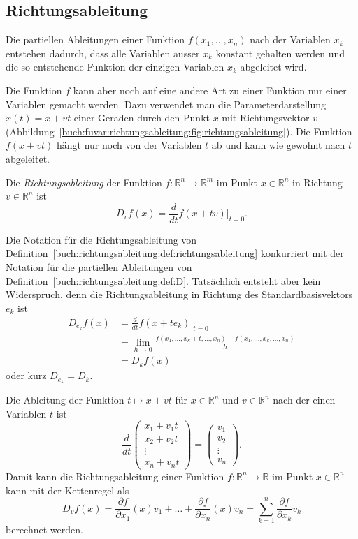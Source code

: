 %
%
\subsection{Richtungsableitung}
Die partiellen Ableitungen einer Funktion $f(x_1,\dots,x_n)$
nach der Variablen $x_k$ entstehen dadurch, dass alle Variablen
ausser $x_k$ konstant gehalten werden und die so entstehende
Funktion der einzigen Variablen $x_k$ abgeleitet wird.

Die Funktion $f$ kann aber noch auf eine andere Art zu einer
Funktion nur einer Variablen gemacht werden.
Dazu verwendet man die Parameterdarstellung $x(t) = x + vt$ einer
Geraden durch den Punkt $x$ mit Richtungsvektor $v$
(Abbildung~\ref{buch:fuvar:richtungsableitung:fig:richtungsableitung}).
Die Funktion $f(x+vt)$ hängt nur noch von der Variablen $t$ ab
und kann wie gewohnt nach $t$ abgeleitet.

\begin{definition}
\label{buch:richtungsableitung:def:richtungsableitung}
Die {\em Richtungsableitung} der Funktion $f\colon\mathbb{R}^n\to\mathbb{R}^m$
%
im Punkt $x\in\mathbb{R}^n$ in Richtung $v\in\mathbb{R}^n$ ist 
\[
D_vf(x)
=
\frac{d}{dt}f(x+tv)\bigg|_{t=0}.
\]
\end{definition}

Die Notation für die Richtungsableitung von
Definition~\ref{buch:richtungsableitung:def:richtungsableitung}
konkurriert mit der Notation für die partiellen Ableitungen von
Definition~\ref{buch:richtungsableitung:def:D}.
Tatsächlich entsteht aber kein Widerspruch, denn die 
Richtungsableitung in Richtung des Standardbasisvektors $e_k$ ist
\begin{align*}
D_{e_k}f(x)
&=
\frac{d}{dt} f(x+te_k)\bigg|_{t=0}
\\
&=
\lim_{h\to 0}
\frac{f(x_1,\dots,x_k+t,\dots,x_n)-f(x_1,\dots,x_k,\dots,x_n)}{h}
\\
&=
D_kf(x)
\end{align*}
oder kurz $D_{e_k}=D_k$.

Die Ableitung der Funktion $t\mapsto x+vt$ für $x\in\mathbb{R}^n$
und $v\in\mathbb{R}^n$ nach der einen Variablen $t$ ist
\[
\frac{d}{dt}
\begin{pmatrix}
x_1+v_1t\\
x_2+v_2t\\
\vdots  \\
x_n+v_nt
\end{pmatrix}
=
\begin{pmatrix}
v_1\\
v_2\\
\vdots\\
v_n
\end{pmatrix}.
\]
Damit kann die Richtungsableitung einer Funktion
$f\colon\mathbb{R}^n\to\mathbb{R}$
im Punkt $x\in\mathbb{R}^n$ kann mit der Kettenregel als
\begin{equation}
D_vf(x)
=
\frac{\partial f}{\partial x_1}(x) v_1
+
\dots
+
\frac{\partial f}{\partial x_n}(x) v_n
=
\sum_{k=1}^n \frac{\partial f}{\partial x_k} v_k
\label{buch:richtungsableitung:eqn:richtungsableitungkette}
\end{equation}
berechnet werden.

